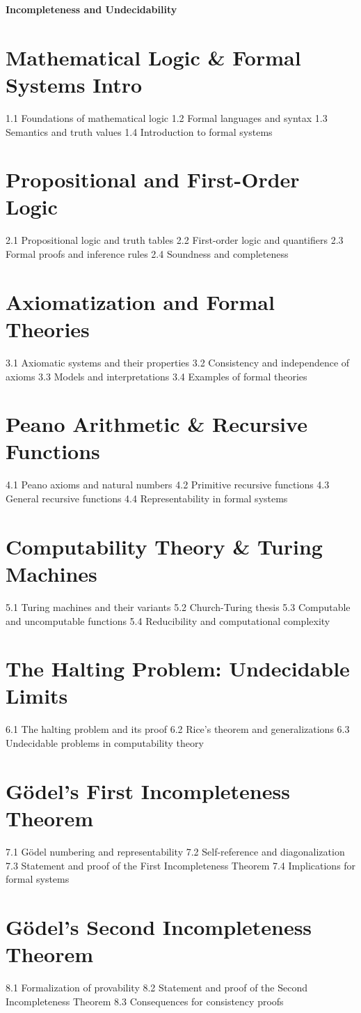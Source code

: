 {\LARGE \bf{Incompleteness and Undecidability}}
\section{Mathematical Logic \& Formal Systems Intro}
1.1 Foundations of mathematical logic
1.2 Formal languages and syntax
1.3 Semantics and truth values
1.4 Introduction to formal systems
\section{Propositional and First-Order Logic}
2.1 Propositional logic and truth tables
2.2 First-order logic and quantifiers
2.3 Formal proofs and inference rules
2.4 Soundness and completeness
\section{Axiomatization and Formal Theories}
3.1 Axiomatic systems and their properties
3.2 Consistency and independence of axioms
3.3 Models and interpretations
3.4 Examples of formal theories
\section{Peano Arithmetic \& Recursive Functions}
4.1 Peano axioms and natural numbers
4.2 Primitive recursive functions
4.3 General recursive functions
4.4 Representability in formal systems
\section{Computability Theory \& Turing Machines}
5.1 Turing machines and their variants
5.2 Church-Turing thesis
5.3 Computable and uncomputable functions
5.4 Reducibility and computational complexity
\section{The Halting Problem: Undecidable Limits}
6.1 The halting problem and its proof
6.2 Rice's theorem and generalizations
6.3 Undecidable problems in computability theory
\section{Gödel's First Incompleteness Theorem}
7.1 Gödel numbering and representability
7.2 Self-reference and diagonalization
7.3 Statement and proof of the First Incompleteness Theorem
7.4 Implications for formal systems
\section{Gödel's Second Incompleteness Theorem}
8.1 Formalization of provability
8.2 Statement and proof of the Second Incompleteness Theorem
8.3 Consequences for consistency proofs
